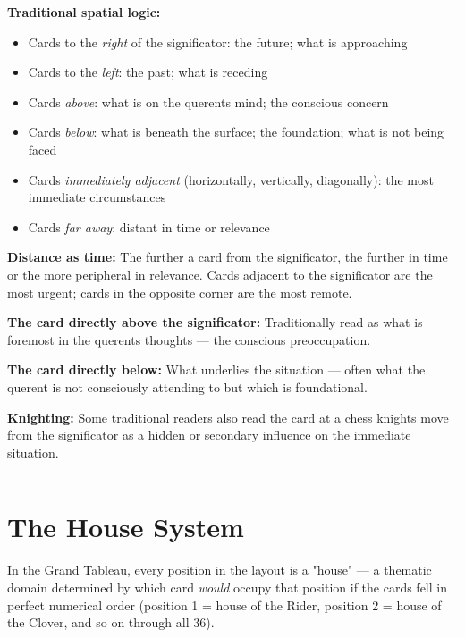 \textbf{Traditional spatial logic:}

\begin{itemize}
\tightlist
\item
  Cards to the \emph{right} of the significator: the future; what is approaching
\item
  Cards to the \emph{left}: the past; what is receding
\item
  Cards \emph{above}: what is on the querent\textquotesingle s mind; the conscious concern
\item
  Cards \emph{below}: what is beneath the surface; the foundation; what is not being faced
\item
  Cards \emph{immediately adjacent} (horizontally, vertically, diagonally): the most immediate circumstances
\item
  Cards \emph{far away}: distant in time or relevance
\end{itemize}

\textbf{Distance as time:} The further a card from the significator, the further in time or the more peripheral in relevance. Cards adjacent to the significator are the most urgent; cards in the opposite corner are the most remote.

\textbf{The card directly above the significator:} Traditionally read as what is foremost in the querent\textquotesingle s thoughts --- the conscious preoccupation.

\textbf{The card directly below:} What underlies the situation --- often what the querent is not consciously attending to but which is foundational.

\textbf{Knighting:} Some traditional readers also read the card at a chess knight\textquotesingle s move from the significator as a hidden or secondary influence on the immediate situation.

\begin{center}\rule{0.5\linewidth}{0.5pt}\end{center}

\section{The House System}\label{the-house-system}

In the Grand Tableau, every position in the layout is a "house" --- a thematic domain determined by which card \emph{would} occupy that position if the cards fell in perfect numerical order (position 1 = house of the Rider, position 2 = house of the Clover, and so on through all 36).

